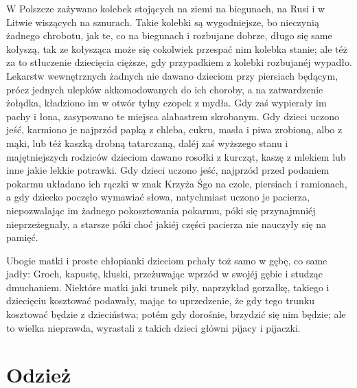 \documentclass{book}
\begin{document}
W Polszcze zażywano kolebek stojących na ziemi na biegunach, na Rusi i w Litwie wiszących na sznurach. Takie kolebki są wygodniejsze, bo nieczynią żadnego chrobotu, jak te, co na biegunach i rozbujane dobrze, długo się same kołyszą, tak ze kołysząca może się cokolwiek przespać nim kolebka stanie; ale téż za to stłuczenie dziecięcia cięższe, gdy przypadkiem z kolebki rozbujanéj wypadło. Lekarstw wewnętrznych żadnych nie dawano dzieciom przy piersiach będącym, prócz jednych ulepków akkomodowanych do ich choroby, a na zatwardzenie żołądka, kładziono im w otwór tylny czopek z mydła. Gdy zaś wypierały im pachy i łona, zasypowano te miejsca alabastrem skrobanym. Gdy dzieci uczono jeść, karmiono je najprzód papką z chleba, cukru, masła i piwa zrobioną, albo z mąki, lub téż kaszką drobną tatarczaną, daléj zaś wyższego stanu i majętniejszych rodziców dzieciom dawano rosołki z kurcząt, kaszę z mlekiem lub inne jakie lekkie potrawki. Gdy dzieci uczono jeść, najprzód przed podaniem pokarmu układano ich rączki w znak Krzyża Śgo na czole, piersiach i ramionach, a gdy dziecko poczęło wymawiać słowa, natychmiast uczono je pacierza, niepozwalając im żadnego pokosztowania pokarmu, póki się przynajmniéj nieprzeżegnały, a starsze póki choć jakiéj części pacierza nie nauczyły się na pamięć.

Ubogie matki i proste chłopianki dzieciom pchały toż samo w gębę, co same jadły: Groch, kapustę, kluski, przeżuwając wprzód w swojéj gębie i studząc dmuchaniem. Niektóre matki jaki trunek piły, naprzykład gorzałkę, takiego i dziecięciu kosztować podawały, mając to uprzedzenie, że gdy tego trunku kosztować będzie z dzieciństwa; potém gdy dorośnie, brzydzić się nim będzie; ale to wielka nieprawda, wyrastali z takich dzieci główni pijacy i pijaczki.

\section{Odzież}
\end{document}
